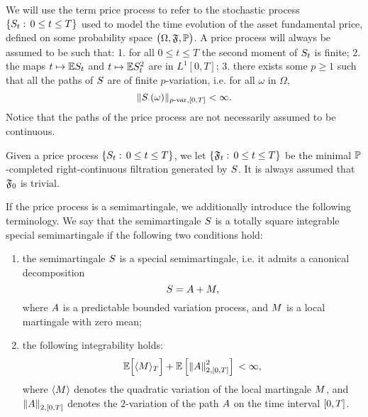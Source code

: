 \documentclass[10pt,a4paper]{article}
\begin{document}
We will use the term price process to refer to the stochastic process $\lbrace \fundamentalPrice_t:\, 0\leq t\leq T\rbrace$ used to model the time  evolution of the asset fundamental price, defined on some probability space $\probabilitySpace$. A price process will always be assumed to be such that: 1. for all $0\leq t\leq T$ the second moment of $\fundamentalPrice_t$ is finite; 2. the maps $t\mapsto \Expectation\fundamentalPrice_t$ and $t\mapsto \Expectation\fundamentalPrice\squared_t$ are in $L^1[0,T]$; 3. there exists some $p\geq 1$ such that all the paths of $\fundamentalPrice$ are of finite $p$-variation, i.e. for all $\omega$ in $\Omega$, 
\begin{equation*}
\pvarNormInterval[\fundamentalPrice_{\cdot} (\omega)]{p}{\timeWindow} < \infty. 
\end{equation*}
Notice that the paths of the price process are not necessarily assumed to be continuous.

Given a price process  $\lbrace \fundamentalPrice_t:\, 0\leq t\leq T\rbrace$, we let $\lbrace \sigmaAlgebra_t: \, 0\leq t\leq T\rbrace$ be the minimal $\Prob$-completed right-continuous filtration generated by $\fundamentalPrice$. It is always assumed that $\sigmaAlgebra_0$ is trivial. 

If the price process is a semimartingale, we additionally introduce the following terminology. We say that the semimartingale $\semimartingale$ is a totally square integrable special semimartingale if the following two conditions hold:
\begin{enumerate}
\item the semimartingale $\semimartingale$ is a special semimartingale, i.e. it admits a canonical decomposition 
\begin{equation*}
\semimartingale=\boundedVariationPart + \martingale,
\end{equation*}
where $\boundedVariationPart$ is a predictable bounded variation process, and $\martingale$ is a local martingale with zero mean;
\item the following integrability holds:
\begin{equation*}
\Expectation \Big[ \langle \martingale \rangle_\timeHorizon  \Big] + \Expectation \left[ \norm[\boundedVariationPart]_{2,\timeWindow}\squared  \right] \, < \infty,
\end{equation*}
where $\langle \martingale \rangle$ denotes the quadratic variation of the local martingale $\martingale$, and $ \norm[\boundedVariationPart]_{2,\timeWindow}$ denotes the $2$-variation of the path $\boundedVariationPart$ on the time interval $\timeWindow$. 
\end{enumerate}
\end{document}
